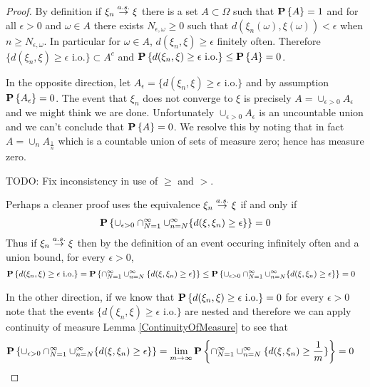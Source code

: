 \begin{proof}
By definition if $\xi_n \overset{a.s.}\to \xi$ there is a set $A \subset \Omega$
such that $\textbf{P}\left \{A \right \} = 1$ and for all $\epsilon > 0$ and $\omega \in A$ there
exists $N_{\epsilon, \omega}\geq 0$ such that $d(\xi_n(\omega), \xi(\omega)) <
\epsilon$ when $n \geq
N_{\epsilon, \omega}$.  In particular for $\omega \in A$, $d(\xi_n, \xi) \geq
  \epsilon$ finitely often.  Therefore $\lbrace d(\xi_n, \xi) \geq
  \epsilon \text{ i.o.} \rbrace \subset A^c$ and $\textbf{P}\left \{d(\xi_n, \xi) \geq
  \epsilon \text{ i.o.} \right \} \leq \textbf{P}\left \{A \right \} = 0$.

In the opposite direction, let $A_\epsilon = \lbrace d(\xi_n, \xi) \geq
  \epsilon \text{ i.o.}\rbrace$ and by assumption
  $\textbf{P}\left \{A_\epsilon \right \} = 0$.  The event that $\xi_n$ does not
  converge to $\xi$ is precisely $A = \cup_{\epsilon > 0} A_\epsilon$
  and we might think we are done.  Unfortunately $\cup_{\epsilon > 0}
  A_\epsilon$ is an uncountable union and we can't conclude that
  $\textbf{P}\left \{A \right \} = 0$.  
  We resolve this by noting that in fact $A = \cup_n A_{\frac{1}{n}}$
  which is a countable union of sets of measure zero; hence has
  measure zero.

TODO: Fix inconsistency in use of $\geq$ and $>$.

Perhaps a cleaner proof uses the equivalence $\xi_n \overset{a.s.}\to \xi$ if and only if 
\begin{align*}
\textbf{P}\left \{\cup_{\epsilon > 0} \cap_{N=1}^\infty \cup_{n=N}^\infty \lbrace d(\xi, \xi_n) \geq \epsilon \rbrace \right \} = 0
\end{align*}  
Thus if $\xi_n \overset{a.s.}\to \xi$ then by the definition of an event occuring infinitely often  and a union bound, for every
$\epsilon > 0$, 
\begin{align*}
\textbf{P}\left \{d(\xi_n, \xi) \geq  \epsilon \text{ i.o.} \right \} &= 
\textbf{P}\left \{\cap_{N=1}^\infty \cup_{n=N}^\infty \lbrace d(\xi, \xi_n) \geq \epsilon \rbrace \right \} 
\leq \textbf{P}\left \{\cup_{\epsilon > 0} \cap_{N=1}^\infty \cup_{n=N}^\infty \lbrace d(\xi, \xi_n) \geq \epsilon \rbrace \right \} = 0
\end{align*}

In the other direction, if we know that $\textbf{P}\left \{d(\xi_n, \xi) \geq  \epsilon \text{ i.o.} \right \}=0$ for every $\epsilon>0$ note that 
the events $\lbrace d(\xi_n, \xi) \geq  \epsilon \text{ i.o.} \rbrace$ are nested and therefore we can apply continuity of measure 
Lemma \ref{ContinuityOfMeasure} to see that
\begin{align*}
\textbf{P}\left \{\cup_{\epsilon > 0} \cap_{N=1}^\infty \cup_{n=N}^\infty \lbrace d(\xi, \xi_n) \geq \epsilon \rbrace \right \} 
&= \lim_{m \to \infty} \textbf{P}\left \{\cap_{N=1}^\infty \cup_{n=N}^\infty \lbrace d(\xi, \xi_n) \geq \frac{1}{m} \rbrace \right \} = 0
\end{align*}


\end{proof}
